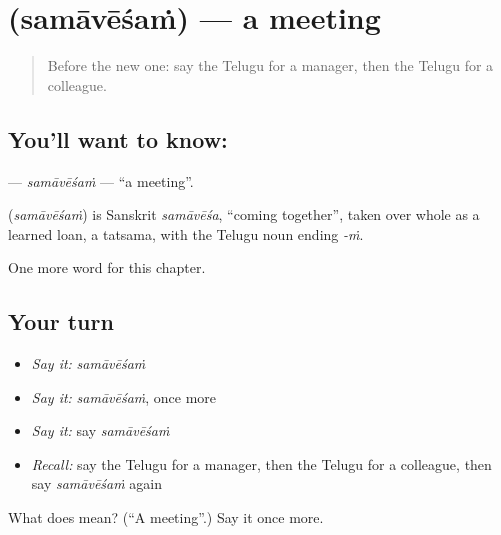 \section[\texorpdfstring{\te{సమావేశం} (samāvēśaṁ)}{సమావేశం (samāvēśaṁ)}]{ (samāvēśaṁ) — a meeting}

\label{lesson:TE-C195-samavesam}



\begin{quote}
Before the new one: say the Telugu for a manager, then the Telugu for a colleague.
\end{quote}

\subsection*{You'll want to know: }
\textbf{} — \emph{samāvēśaṁ} — \textquotedblleft{}a meeting\textquotedblright{}.

\begin{cousinweb}
\textbf{} (\emph{samāvēśaṁ}) is Sanskrit \emph{samāvēśa}, \textquotedblleft{}coming together\textquotedblright{}, taken over whole as a learned loan, a tatsama, with the Telugu noun ending \emph{-ṁ}.
\end{cousinweb}

\begin{grammarlens}[title={What you've built}]
One more word for this chapter.
\end{grammarlens}

\subsection*{Your turn}
\begin{itemize}
\raggedright
  \item \emph{Say it:} \emph{samāvēśaṁ}
  \item \emph{Say it:} \emph{samāvēśaṁ}, once more
  \item \emph{Say it:} say \emph{samāvēśaṁ}
  \item \emph{Recall:} say the Telugu for a manager, then the Telugu for a colleague, then say \emph{samāvēśaṁ} again
\end{itemize}

\begin{tcolorbox}[breakable,colback=teal!4,colframe=teal!35!black,title={Before you move on}]
What does  mean? (\textquotedblleft{}A meeting\textquotedblright{}.) Say it once more.
\end{tcolorbox}
